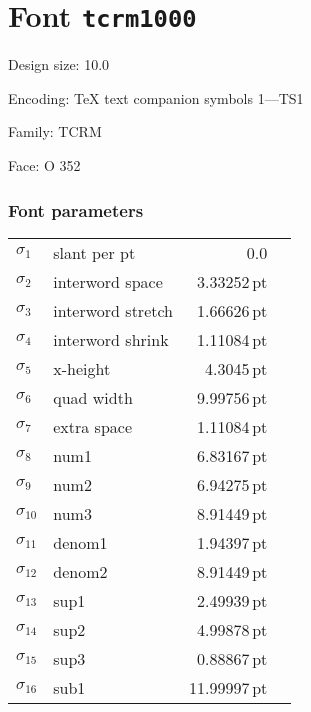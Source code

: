 \documentclass{article}
\newlength{\maxcharwidth}
\begin{document}
\setlength{\maxcharwidth}{100.75558pt}
\addtolength{\maxcharwidth}{2\fboxsep}

\section{Font \texttt{tcrm1000}}


Design size: 10.0\,

Encoding: TeX text companion symbols 1---TS1

Family: TCRM

Face: O 352

\subsubsection{Font parameters}

\begin{tabular}{@{}llr@{\quad}l}
$\sigma_1$ & slant per pt & 0.0 \\
$\sigma_2$ & interword space & 3.33252\,pt \\
$\sigma_3$ & interword stretch & 1.66626\,pt \\
$\sigma_4$ & interword shrink & 1.11084\,pt \\
$\sigma_5$ & x-height & 4.3045\,pt \\
$\sigma_6$ & quad width & 9.99756\,pt \\
$\sigma_7$ & extra space & 1.11084\,pt \\
$\sigma_8$ & num1 & 6.83167\,pt \\
$\sigma_9$ & num2 & 6.94275\,pt \\
$\sigma_{10}$ & num3 & 8.91449\,pt \\
$\sigma_{11}$ & denom1 & 1.94397\,pt \\
$\sigma_{12}$ & denom2 & 8.91449\,pt \\
$\sigma_{13}$ & sup1 & 2.49939\,pt \\
$\sigma_{14}$ & sup2 & 4.99878\,pt \\
$\sigma_{15}$ & sup3 & 0.88867\,pt \\
$\sigma_{16}$ & sub1 & 11.99997\,pt \\
\end{tabular}
\end{document}

